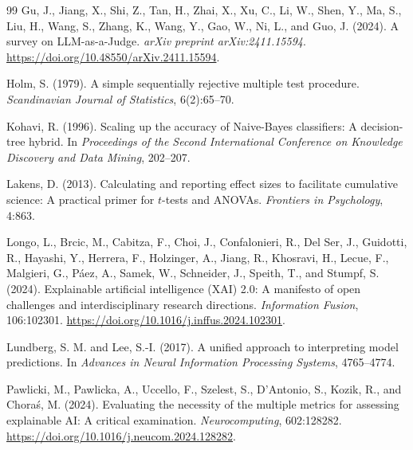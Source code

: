 \documentclass[twoside,11pt]{article}
\begin{document}
\begin{thebibliography}{99}
Gu, J., Jiang, X., Shi, Z., Tan, H., Zhai, X., Xu, C., Li, W., Shen, Y.,
Ma, S., Liu, H., Wang, S., Zhang, K., Wang, Y., Gao, W., Ni, L., and Guo, J.
(2024).
A survey on LLM-as-a-Judge.
\emph{arXiv preprint arXiv:2411.15594}.
\url{https://doi.org/10.48550/arXiv.2411.15594}.

Holm, S. (1979).
A simple sequentially rejective multiple test procedure.
\emph{Scandinavian Journal of Statistics}, 6(2):65--70.

Kohavi, R. (1996).
Scaling up the accuracy of Naive-Bayes classifiers: A decision-tree
hybrid.
In \emph{Proceedings of the Second International Conference on Knowledge
Discovery and Data Mining}, 202--207.

Lakens, D. (2013).
Calculating and reporting effect sizes to facilitate cumulative science:
A practical primer for \(t\)-tests and ANOVAs.
\emph{Frontiers in Psychology}, 4:863.

Longo, L., Brcic, M., Cabitza, F., Choi, J., Confalonieri, R., Del Ser, J.,
Guidotti, R., Hayashi, Y., Herrera, F., Holzinger, A., Jiang, R.,
Khosravi, H., Lecue, F., Malgieri, G., P\'{a}ez, A., Samek, W.,
Schneider, J., Speith, T., and Stumpf, S. (2024).
Explainable artificial intelligence (XAI) 2.0: A manifesto of open
challenges and interdisciplinary research directions.
\emph{Information Fusion}, 106:102301.
\url{https://doi.org/10.1016/j.inffus.2024.102301}.

Lundberg, S. M. and Lee, S.-I. (2017).
A unified approach to interpreting model predictions.
In \emph{Advances in Neural Information Processing Systems}, 4765--4774.

Pawlicki, M., Pawlicka, A., Uccello, F., Szelest, S., D'Antonio, S.,
Kozik, R., and Chora\'{s}, M. (2024).
Evaluating the necessity of the multiple metrics for assessing
explainable AI: A critical examination.
\emph{Neurocomputing}, 602:128282.
\url{https://doi.org/10.1016/j.neucom.2024.128282}.


\end{thebibliography}
\end{document}
